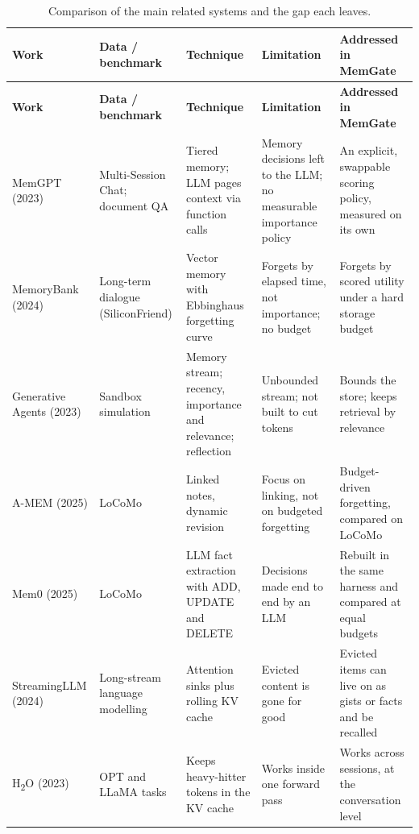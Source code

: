 {\renewcommand{\arraystretch}{1.15}
\fontsize{9}{11}\selectfont
\begin{longtable}{@{}>{\raggedright\arraybackslash}p{2.3cm}>{\raggedright\arraybackslash}p{2.3cm}>{\raggedright\arraybackslash}p{2.7cm}>{\raggedright\arraybackslash}p{2.6cm}>{\raggedright\arraybackslash}p{2.7cm}@{}}
\caption{Comparison of the main related systems and the gap each leaves.}
\label{tab:litcompare}\\
\toprule
\textbf{Work} & \textbf{Data / benchmark} & \textbf{Technique} & \textbf{Limitation} & \textbf{Addressed in MemGate} \\
\midrule
\endfirsthead
\toprule
\textbf{Work} & \textbf{Data / benchmark} & \textbf{Technique} & \textbf{Limitation} & \textbf{Addressed in MemGate} \\
\midrule
\endhead
MemGPT \cite{packer2023memgpt} (2023) & Multi-Session Chat; document QA & Tiered memory; LLM pages context via function calls & Memory decisions left to the LLM; no measurable importance policy & An explicit, swappable scoring policy, measured on its own \\
MemoryBank \cite{zhong2024memorybank} (2024) & Long-term dialogue (SiliconFriend) & Vector memory with Ebbinghaus forgetting curve & Forgets by elapsed time, not importance; no budget & Forgets by scored utility under a hard storage budget \\
Generative Agents \cite{park2023generative} (2023) & Sandbox simulation & Memory stream; recency, importance and relevance; reflection & Unbounded stream; not built to cut tokens & Bounds the store; keeps retrieval by relevance \\
A-MEM \cite{xu2025amem} (2025) & LoCoMo & Linked notes, dynamic revision & Focus on linking, not on budgeted forgetting & Budget-driven forgetting, compared on LoCoMo \\
Mem0 \cite{chhikara2025mem0} (2025) & LoCoMo & LLM fact extraction with ADD, UPDATE and DELETE & Decisions made end to end by an LLM & Rebuilt in the same harness and compared at equal budgets \\
StreamingLLM \cite{xiao2024streaming} (2024) & Long-stream language modelling & Attention sinks plus rolling KV cache & Evicted content is gone for good & Evicted items can live on as gists or facts and be recalled \\
H\textsubscript{2}O \cite{zhang2023h2o} (2023) & OPT and LLaMA tasks & Keeps heavy-hitter tokens in the KV cache & Works inside one forward pass & Works across sessions, at the conversation level \\

\end{longtable}}
